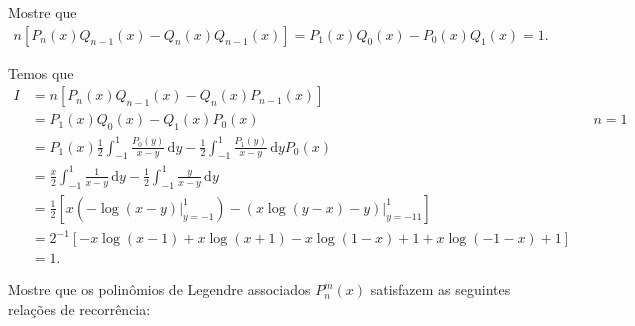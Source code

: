 \documentclass[a4paper,12pt, leqno, answers]{exam}
\begin{document}
\begin{questions}
    \question Mostre que
    \begin{align*}
        n \left[ P_n(x) Q_{n - 1}(x) - Q_n(x) Q_{n - 1}(x) \right] = P_1(x) Q_0(x) - P_0(x) Q_1(x) = 1.
    \end{align*}
    \begin{solution}
        Temos que
        \begin{align*}
            I &= n \left[ P_n(x) Q_{n - 1}(x) - Q_n(x) P_{n - 1}(x) \right] \\
            &= P_1(x) Q_0(x) - Q_1(x) P_0(x) && n = 1 \\
            &= P_1(x) \frac{1}{2} \int_{-1}^1 \frac{P_0(y)}{x - y} \,\mathrm{d}y - \frac{1}{2} \int_{-1}^1 \frac{P_1(y)}{x - y} \,\mathrm{d}y P_0(x) \\
            &= \frac{x}{2} \int_{-1}^1 \frac{1}{x - y} \,\mathrm{d}y - \frac{1}{2} \int_{-1}^1 \frac{y}{x - y} \,\mathrm{d}y \\
            &= \frac{1}{2} \left[ x \left( \left. -\log(x - y) \right|_{y = -1}^1 \right) - \left. \left( x \log(y - x) - y \right) \right|_{y = -11}^1 \right] \\
            &= 2^{-1} \left[ -x \log(x - 1) + x \log(x + 1) - x \log(1 - x) + 1 + x \log(-1 - x) + 1 \right] \\
            &= 1.
        \end{align*}
    \end{solution}

    \question Mostre que os polinômios de Legendre associados $P_n^m(x)$ satisfazem as seguintes rela\c{c}\~{o}es de recorr\^{e}ncia:
    \begin{parts}

\end{parts}
\end{questions}
\end{document}
